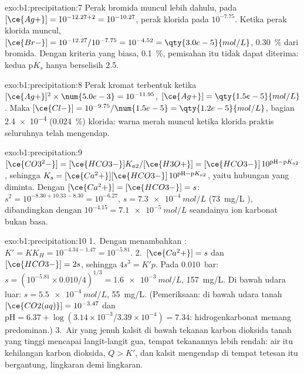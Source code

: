 \begin{solution}{exo:b1:precipitation:7}
Perak bromida muncul lebih dahulu, pada $[\ce{Ag+}] = 10^{-12.27 + 2} =
10^{-10.27}$, perak klorida pada $10^{-7.75}$. Ketika perak klorida
muncul, $[\ce{Br-}] = 10^{-12.27}/10^{-7.75} = 10^{-4.52} =
\qty{3.0e-5}{mol/L}$, \qty{0.30}{\percent} dari bromida. Dengan kriteria
yang biasa, \qty{0.1}{\percent}, pemisahan itu tidak dapat diterima:
kedua $\mathrm{p}K_s$ hanya berselisih 2.5.
\end{solution}

\begin{solution}{exo:b1:precipitation:8}
Perak kromat terbentuk ketika $[\ce{Ag+}]^2 \times \num{5.0e-3} = 10^{-11.95}$,
$[\ce{Ag+}] = \qty{1.5e-5}{mol/L}$. Maka $[\ce{Cl-}] = 10^{-9.75}/\num{1.5e-5}
= \qty{1.2e-5}{mol/L}$, bagian \num{2.4e-4} (\qty{0.024}{\percent})
klorida: warna merah muncul ketika klorida praktis seluruhnya telah
mengendap.
\end{solution}

\begin{solution}{exo:b1:precipitation:9}
$[\ce{CO3^2-}] = [\ce{HCO3-}]K_{a2}/[\ce{H3O+}] = [\ce{HCO3-}]\,10^{\mathrm{pH}
- \mathrm{p}K_{a2}}$, sehingga $K_s = [\ce{Ca^2+}][\ce{HCO3-}]\,10^{\mathrm{pH} -
\mathrm{p}K_{a2}}$, yaitu hubungan yang diminta. Dengan $[\ce{Ca^2+}] =
[\ce{HCO3-}] = s$: $s^2 = 10^{-8.30 + 10.33 - 8.30} = 10^{-6.27}$,
$s = \qty{7.3e-4}{mol/L}$ (\qty{73}{mg/L} ), dibandingkan dengan
$10^{-4.15} = \qty{7.1e-5}{mol/L}$ seandainya ion karbonat bukan basa.
\end{solution}

\begin{solution}{exo:b1:precipitation:10}
1.~Dengan menambahkan : $K' = K K_H = 10^{-4.34 - 1.47} =
10^{-5.81}$.
2.~$[\ce{Ca^2+}] = s$ dan $[\ce{HCO3-}] = 2s$, sehingga $4s^3 = K'p$. Pada
\qty{0.010}{bar}: $s = (10^{-5.81} \times 0.010/4)^{1/3} =
\qty{1.6e-3}{mol/L}$, \qty{157}{mg/L}. Di bawah udara luar:
$s = \qty{5.5e-4}{mol/L}$, \qty{55}{mg/L}. (Pemeriksaan: di bawah udara
tanah $[\ce{CO2(aq)}] = 10^{-3.47}$ dan $\mathrm{pH} = 6.37 + \log(3.14\times
10^{-3}/3.39 \times 10^{-4}) = 7.34$: hidrogenkarbonat memang
predominan.)
3.~Air yang jenuh kalsit di bawah tekanan karbon dioksida tanah yang
tinggi mencapai langit-langit gua, tempat tekanannya lebih rendah: air
itu kehilangan karbon dioksida, $Q > K'$, dan kalsit mengendap di tempat
tetesan itu bergantung, lingkaran demi lingkaran.
\end{solution}

